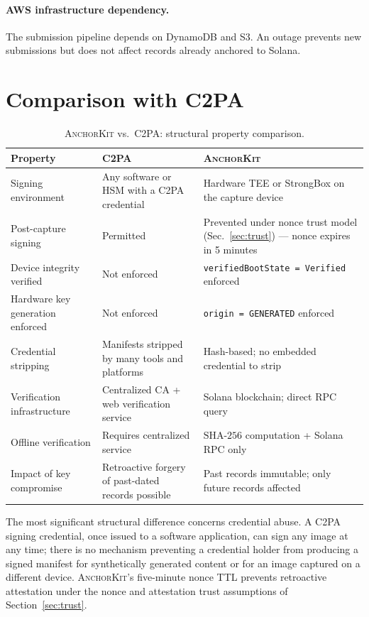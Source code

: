 \documentclass[11pt,a4paper]{article}
\newcommand{\SHA}{\text{SHA-256}}
\newcommand{\AK}{\textsc{AnchorKit}\xspace}
\begin{document}
\paragraph{AWS infrastructure dependency.} The submission pipeline depends on
DynamoDB and S3.  An outage prevents new submissions but does not affect records
already anchored to Solana.

\section{Comparison with C2PA}
\label{sec:comparison}

\begin{table}[ht]
\centering
\caption{\AK vs.\ C2PA: structural property comparison.}
\label{tab:comparison}
\renewcommand{\arraystretch}{1.4}
\begin{tabular}{@{}p{3.8cm}p{4.4cm}p{5.6cm}@{}}
\toprule
\textbf{Property} & \textbf{C2PA} & \textbf{\AK} \\
\midrule
Signing environment
  & Any software or HSM with a C2PA credential
  & Hardware TEE or StrongBox on the capture device \\
Post-capture signing
  & Permitted
  & Prevented under nonce trust model (Sec.~\ref{sec:trust}) ---
    nonce expires in 5 minutes \\
Device integrity verified
  & Not enforced
  & \texttt{verifiedBootState = Verified} enforced \\
Hardware key generation enforced
  & Not enforced
  & \texttt{origin = GENERATED} enforced \\
Credential stripping
  & Manifests stripped by many tools and platforms
  & Hash-based; no embedded credential to strip \\
Verification infrastructure
  & Centralized CA + web verification service
  & Solana blockchain; direct RPC query \\
Offline verification
  & Requires centralized service
  & $\SHA$ computation + Solana RPC only \\
Impact of key compromise
  & Retroactive forgery of past-dated records possible
  & Past records immutable; only future records affected \\
\bottomrule
\end{tabular}
\end{table}

The most significant structural difference concerns credential abuse.  A C2PA
signing credential, once issued to a software application, can sign any image
at any time; there is no mechanism preventing a credential holder from producing
a signed manifest for synthetically generated content or for an image captured
on a different device.  \AK's five-minute nonce TTL prevents retroactive
attestation under the nonce and attestation trust assumptions of
Section~\ref{sec:trust}.
\end{document}
